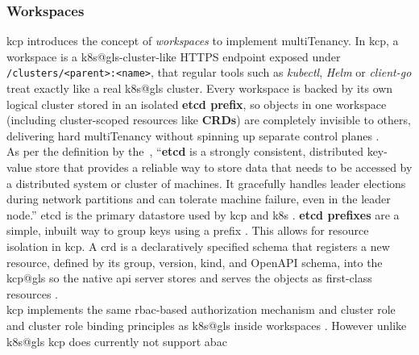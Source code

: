 \documentclass[11pt, a4paper, oneside, listof=totoc]{scrartcl}
\begin{document}
            \subsubsection{Workspaces}\label{subsubsec:workspaces}
                \gls{kcp} introduces the concept of \textit{workspaces} to implement
                \gls{multiTenancy}.
                In \gls{kcp}, a workspace is a \gls{k8s@gls}-cluster-like HTTPS endpoint exposed
                under \texttt{/clusters/<parent>:<name>}, that regular tools such as
                \textit{kubectl}, \textit{Helm} or \textit{client-go} treat exactly like a real
                \gls{k8s@gls} cluster.
                Every workspace is backed by its own logical cluster stored in an isolated
                \textbf{\gls{etcd} prefix}, so objects in one workspace (including cluster-scoped
                resources like \textbf{CRDs}) are completely invisible to others, delivering hard
                \gls{multiTenancy} without spinning up separate control planes
                \parencite{kcpWorkspaces}.
                \\
                As per the definition by the~\cite{etcd}, \enquote{\textbf{\gls{etcd}} is a strongly
                consistent, distributed key-value store that provides a reliable way to store data
                that needs to be accessed by a distributed system or cluster of machines.
                It gracefully handles leader elections during network partitions and can tolerate
                machine failure, even in the leader node.}
                \gls{etcd} is the primary datastore used by \gls{kcp} and \gls{k8s}
                \parencites{kcpDevStorageToRest}[p.~214]{sun2021}.
                \textbf{\gls{etcd} prefixes} are a simple, inbuilt way to group keys using a prefix
                \parencite{etcdPrefix}.
                This allows for resource isolation in \gls{kcp}.\@
                A \gls{crd} is a declaratively specified schema that registers a new  resource,
                defined by its group, version, kind, and OpenAPI schema, into the \gls{kcp@gls} so
                the native \gls{api} server stores and serves the objects as first-class
                resources \parencite{kubernetesCRD}.
                \\
                \gls{kcp} implements the same \gls{rbac}-based authorization mechanism and cluster
                role and cluster role binding principles as \gls{k8s@gls} inside workspaces 
                \parencite{kcpAuthorization}.
                However unlike \gls{k8s@gls} \gls{kcp} does currently not support \gls{abac}
\end{document}
